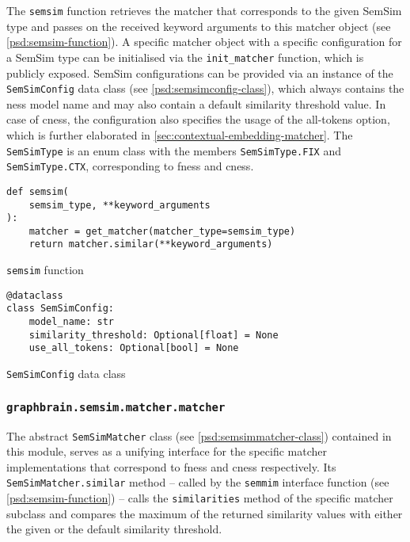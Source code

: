 \documentclass[11pt, numbers=noenddot]{scrreprt}
\begin{document}
The \texttt{semsim} function retrieves the matcher that corresponds to the given SemSim type and passes on the received keyword arguments to this matcher object (see \cref{psd:semsim-function}). A specific matcher object with a specific configuration for a SemSim type can be initialised via the \texttt{init\_matcher} function, which is publicly exposed. 
SemSim configurations can be provided via an instance of the \texttt{SemSimConfig} data class (see \cref{psd:semsimconfig-class}), which always contains the \gls{ness} model name and may also contain a default similarity threshold value. In case of \gls{cness}, the configuration also specifies the usage of the all-tokens option, which is further elaborated in \cref{sec:contextual-embedding-matcher}. The \texttt{SemSimType} is an enum class with the members \texttt{SemSimType.FIX} and \texttt{SemSimType.CTX}, corresponding to \gls{fness} and \gls{cness}. 


\begin{pseudo}
\begin{lstlisting}
def semsim(
    semsim_type, **keyword_arguments
):
    matcher = get_matcher(matcher_type=semsim_type)
    return matcher.similar(**keyword_arguments)
\end{lstlisting}
\caption{\texttt{semsim} function}
\label{psd:semsim-function}
\end{pseudo}

\begin{pseudo}
\begin{lstlisting}
@dataclass
class SemSimConfig:
    model_name: str
    similarity_threshold: Optional[float] = None
    use_all_tokens: Optional[bool] = None
\end{lstlisting}
\caption{\texttt{SemSimConfig} data class}
\label{psd:semsimconfig-class}
\end{pseudo}


\subsubsection{\texttt{graphbrain.semsim.matcher.matcher}}
The abstract \texttt{SemSimMatcher} class (see \cref{psd:semsimmatcher-class}) contained in this module, serves as a unifying interface for the specific matcher implementations that correspond to \gls{fness} and \gls{cness} respectively. Its \texttt{SemSimMatcher.similar} method -- called by the \texttt{semmim} interface function (see \cref{psd:semsim-function}) -- calls the \texttt{similarities} method of the specific matcher subclass and compares the maximum of the returned similarity values with either the given or the default similarity threshold.
\end{document}
